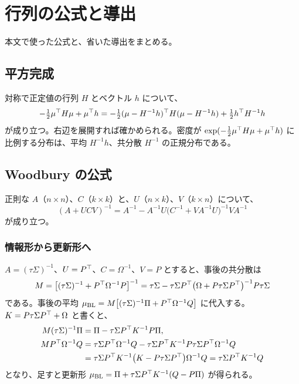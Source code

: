 \chapter{行列の公式と導出}\label{app:formulas}

本文で使った公式と、省いた導出をまとめる。

\section{平方完成}

対称で正定値の行列 $H$ とベクトル $h$ について、
\begin{equation}
-\tfrac12\mu^{\top} H\mu+\mu^{\top} h=-\tfrac12(\mu-H^{-1}h)^{\top} H(\mu-H^{-1}h)+\tfrac12h^{\top} H^{-1}h
\end{equation}
が成り立つ。右辺を展開すれば確かめられる。密度が $\exp(-\frac12\mu^{\top} H\mu+\mu^{\top} h)$ に比例する分布は、平均 $H^{-1}h$、共分散 $H^{-1}$ の正規分布である。

\section{Woodbury の公式}

正則な $A$（$n\times n$）、$C$（$k\times k$）と、$U$（$n\times k$）、$V$（$k\times n$）について、
\begin{equation}
(A+UCV)^{-1}=A^{-1}-A^{-1}U\bigl(C^{-1}+VA^{-1}U\bigr)^{-1}VA^{-1}
\end{equation}
が成り立つ。

\subsection*{情報形から更新形へ}

$A=(\tau\Sigma)^{-1}$、$U=P^{\top}$、$C=\Omega^{-1}$、$V=P$ とすると、事後の共分散は
\begin{equation}
M=\bigl[(\tau\Sigma)^{-1}+P^{\top}\Omega^{-1}P\bigr]^{-1}=\tau\Sigma-\tau\Sigma P^{\top}\bigl(\Omega+P\tau\Sigma P^{\top}\bigr)^{-1}P\tau\Sigma
\end{equation}
である。事後の平均 $\mu_{\mathrm{BL}}=M\bigl[(\tau\Sigma)^{-1}\Pi+P^{\top}\Omega^{-1}Q\bigr]$ に代入する。$K=P\tau\Sigma P^{\top}+\Omega$ と書くと、
\begin{align}
M(\tau\Sigma)^{-1}\Pi&=\Pi-\tau\Sigma P^{\top} K^{-1}P\Pi,\\
MP^{\top}\Omega^{-1}Q&=\tau\Sigma P^{\top}\Omega^{-1}Q-\tau\Sigma P^{\top} K^{-1}P\tau\Sigma P^{\top}\Omega^{-1}Q\notag\\
&=\tau\Sigma P^{\top} K^{-1}\bigl(K-P\tau\Sigma P^{\top}\bigr)\Omega^{-1}Q=\tau\Sigma P^{\top} K^{-1}Q
\end{align}
となり、足すと更新形 $\mu_{\mathrm{BL}}=\Pi+\tau\Sigma P^{\top} K^{-1}(Q-P\Pi)$ が得られる。

